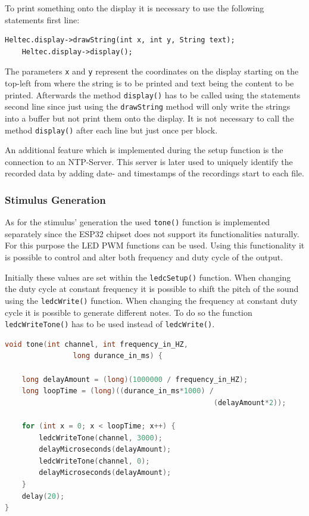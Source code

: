 To print something onto the display it is necessary to use the following statements first line:
\begin{lstlisting}[style=inText]
	Heltec.display->drawString(int x, int y, String text);
	Heltec.display->display();
\end{lstlisting}
The parameters \texttt{x} and \texttt{y} represent the coordinates on the display starting on the top-left from where the string is to be printed and text being the content to be printed.
Afterwards the method \texttt{display()} has to be called using the  statements second line since just using the \texttt{drawString} method will only write the strings into a buffer but not print them onto the
display.
It is not necessary to call the method \texttt{display()} after each line but just once per block.

An additional feature which is implemented during the setup function is the connection to an NTP-Server.
This server is later used to uniquely identify the recorded data by adding date- and timestamps of the recordings start to each file.

\subsubsection{Stimulus Generation}
As for the stimulus' generation the used \texttt{tone()} function is implemented separately since the ESP32 chipset does not support its functionalities naturally.
For this purpose the LED PWM functions can be used.
Using this functionality it is possible to control and alter both frequency and duty cycle of the output.

Initially these values are set within the \texttt{ledcSetup()} function.
When changing the duty cycle at constant frequency it is possible to shift the pitch of the sound using the \texttt{ledcWrite()} function.
When changing the frequency at constant duty cycle it is possible to generate different notes.
To do so the function \texttt{ledcWriteTone()} has to be used instead of \texttt{ledcWrite()}.
\begin{lstlisting}[frame=single, language={c++}, style=style,
				   caption={Function used to generate a single note using frequency and sound duration.}, label={lst:toneFunct},float=!htb]
void tone(int channel, int frequency_in_HZ,
		  		long durance_in_ms) {

	long delayAmount = (long)(1000000 / frequency_in_HZ);
	long loopTime = (long)((durance_in_ms*1000) / 
												 (delayAmount*2));

	for (int x = 0; x < loopTime; x++) {
		ledcWriteTone(channel, 3000);
		delayMicroseconds(delayAmount);
		ledcWriteTone(channel, 0);
		delayMicroseconds(delayAmount);
	}
	delay(20);
}
\end{lstlisting}

